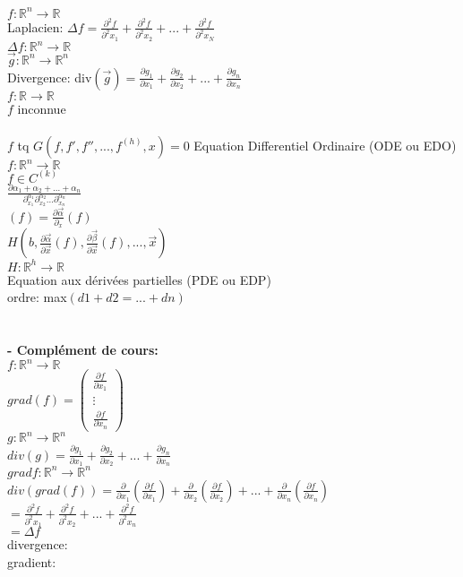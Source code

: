 \documentclass{article}
\begin{document}
    $f:\mathbb{R}^n\to \mathbb{R}$\\
    Laplacien: $\Delta f= \frac{\partial^2 f}{\partial^2 x_1} +
    \frac{\partial^2 f}{\partial^2 x_2}+...+\frac{\partial^2 f}{\partial^2 x_N}$\\
    $\Delta f: \mathbb{R}^n\to \mathbb{R}$\\
    $\vec{g}: \mathbb{R}^n\to \mathbb{R}^n$\\
    Divergence: div$(\vec{g})=\frac{\partial g_1}{\partial x_1}+
    \frac{\partial g_2}{\partial x_2}+...+
    \frac{\partial g_n}{\partial x_n}$\\
    $f:\mathbb{R}\to \mathbb{R}$\\
    $f$ inconnue\\\\
    $f$ tq $G(f,f',f'',...,f^{(h)},x)=0$ Equation Differentiel Ordinaire (ODE ou EDO)\\
    $f:\mathbb{R}^n\to \mathbb{R}$\\
    $f \in C^{(k)}$\\
    $\frac{\partial{\alpha_1 +\alpha_2+...+\alpha_n}}{\partial^{\alpha_1}_{x_1}
    \partial^{\alpha_2}_{x_2} ... \partial^{\alpha_n}_{x_n}}$\\
    $(f)=\frac{\partial \vec{\alpha}}{\partial_x}(f)$\\
    $H(b,\frac{\partial \vec{\alpha}}{\partial \vec{x}}(f),\frac{\partial \vec{\beta}}{\partial \vec{x}}(f),...,\vec{x})$\\
    $H:\mathbb{R}^h\to \mathbb{R}$\\
    Equation aux dérivées partielles (PDE ou EDP)\\
    ordre: max$(d1+d2=...+dn)$\\\\\\
    \textbf{- Complément de cours:}\\
    $f:\mathbb{R}^n\to \mathbb{R}$\\
    $grad(f)=
    \begin{pmatrix}
        \frac{\partial f}{\partial x_1}\\
        \vdots\\
        \frac{\partial f}{\partial x_n}    
    \end{pmatrix}$\\
    $g:\mathbb{R}^n\to \mathbb{R}^n$\\
    $div(g)=\frac{\partial g_1}{\partial x_1}+\frac{\partial g_2}{\partial x_2}+...+\frac{\partial g_n}{\partial x_n}$\\
    $grad f:\mathbb{R}^n\to \mathbb{R}^n$\\
    $div(grad(f))=\frac{\partial}{\partial x_1}(\frac{\partial f}{\partial x_1})+\frac{\partial}{\partial x_2}(\frac{\partial f}{\partial x_2})+...+\frac{\partial}{\partial x_n}(\frac{\partial f}{\partial x_n})$\\
    $=\frac{\partial^2 f}{\partial^2 x_1}+\frac{\partial^2 f}{\partial^2 x_2}+...+\frac{\partial^2 f}{\partial^2 x_n}$\\
    $=\Delta f$\\
    divergence:  \\
    gradient: \\
\end{document}
